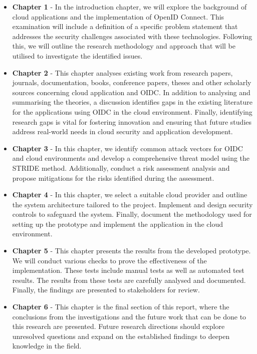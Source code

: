 \begin{itemize}
    \item \textbf{Chapter 1} - In the introduction chapter, we will explore the background of cloud applications and the implementation of OpenID Connect. This examination will include a definition of a specific problem statement that addresses the security challenges associated with these technologies. Following this, we will outline the research methodology and approach that will be utilised to investigate the identified issues. 
    

    \item \textbf{Chapter 2} - This chapter analyses existing work from research papers, journals, documentation, books, conference papers, theses and other scholarly sources concerning cloud application and OIDC.
    In addition to analysing and summarising the theories, a discussion identifies gaps in the existing literature for the applications using OIDC in the cloud environment. Finally, identifying research gaps is vital for fostering innovation and ensuring that future studies address real-world needs in cloud security and application development.
    
    \item \textbf{Chapter 3} - In this chapter, we identify common attack vectors for OIDC and cloud environments and develop a comprehensive threat model using the STRIDE method. Additionally, conduct a risk assessment analysis and propose mitigations for the risks identified during the assessment.
    
    \item \textbf{Chapter 4} - In this chapter, we select a suitable cloud provider and outline the system architecture tailored to the project. Implement and design security controls to safeguard the system. Finally, document the methodology used for setting up the prototype and implement the application in the cloud environment.
    
    \item \textbf{Chapter 5} - This chapter presents the results from the developed prototype. We will conduct various checks to prove the effectiveness of the implementation. These tests include manual tests as well as automated test results. The results from these tests are carefully analysed and documented. Finally, the findings are presented to stakeholders for review.
    
    \item \textbf{Chapter 6} - This chapter is the final section of this report, where the conclusions from the investigations and the future work that can be done to this research are presented. Future research directions should explore unresolved questions and expand on the established findings to deepen knowledge in the field.

\end{itemize}